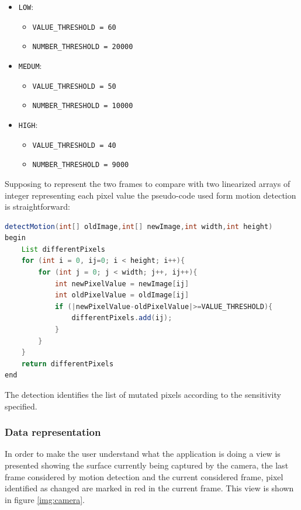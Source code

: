 \documentclass[conference]{IEEEtran}
\begin{document}
\begin{itemize}
	\item \texttt{LOW}:
		\begin{itemize}
		\item \texttt{VALUE\_THRESHOLD = 60}
		\item \texttt{NUMBER\_THRESHOLD = 20000}
		\end{itemize}
	\item \texttt{MEDUM}:
		\begin{itemize}
		\item \texttt{VALUE\_THRESHOLD = 50}
		\item \texttt{NUMBER\_THRESHOLD = 10000}
		\end{itemize}
	\item \texttt{HIGH}:
		\begin{itemize}
		\item \texttt{VALUE\_THRESHOLD = 40}
		\item \texttt{NUMBER\_THRESHOLD = 9000}
		\end{itemize}
\end{itemize}

Supposing to represent the two frames to compare with two linearized arrays of integer representing each pixel value the pseudo-code used form motion detection is straightforward:

\begin{lstlisting}[language=Java, caption=Pseudocode for motion detection]
detectMotion(int[] oldImage,int[] newImage,int width,int height)
begin
	List differentPixels
	for (int i = 0, ij=0; i < height; i++){
		for (int j = 0; j < width; j++, ij++){
			int newPixelValue = newImage[ij]
			int oldPixelValue = oldImage[ij]
			if (|newPixelValue-oldPixelValue|>=VALUE_THRESHOLD){
	            differentPixels.add(ij);
			}
		}
	}
	return differentPixels		
end
\end{lstlisting}

The detection identifies the list of mutated pixels according to the sensitivity specified.\\

\subsubsection{\textbf{Data representation}}
In order to make the user understand what the application is doing a view is presented showing the surface currently being captured by the camera, the last frame considered by motion detection and the current considered frame, pixel identified as changed are marked in red in the current frame. This view is shown in figure \ref{img:camera}.\\
\end{document}
